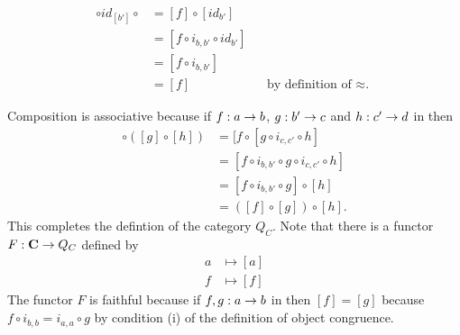 \documentclass[10pt,a4paper]{scrartcl}
\begin{document}
\begin{align*}
[f] \circ id_{[b']} \circ  & = [f]  \circ [id_{b'}]                                     \\
                 &=  [f \circ i_{b,b'} \circ id_{b'} ]                                  \\
                 &=  [f \circ i_{b,b'} ]                                                \\
                 &=  [f]                & &\mbox {by definition of $\approx$. }
\end{align*}


Composition is associative because if $f:a \rightarrow b$, $g: b' \rightarrow c$  and $h: c' \rightarrow d$ in \catcw then
\begin{align*}
[f] \circ ([g] \circ [h]) &= [f \circ [g \circ i_{c,c'} \circ h]               \\
                          &= [f \circ i_{b,b'} \circ g \circ i_{c,c'} \circ h] \\
													&= [f \circ i_{b,b'} \circ g] \circ [h]              \\
													&= ([f] \circ [g]) \circ [h].
\end{align*}
This completes the defintion of the category $Q_C$.
Note that there is a functor $F: \textbf{C} \rightarrow Q_C$ defined by
\begin{align*}
       a & \mapsto [a] \\
			 f & \mapsto [f]
\end{align*}
The functor $F$ is faithful because if $f,g : a \rightarrow b$ in \catcw then $[f]=[g]$ because $f \circ i_{b,b}=i_{a,a} \circ g$ by condition (i) of the definition of object congruence.
\end{document}
